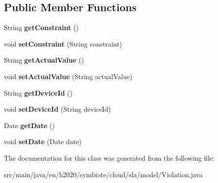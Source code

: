 \subsection*{Public Member Functions}
\begin{DoxyCompactItemize}
\item 
\mbox{\label{classeu_1_1h2020_1_1symbiote_1_1cloud_1_1sla_1_1model_1_1Violation_aee06224480e328f5052d47876c301592}} 
String {\bfseries get\+Constraint} ()
\item 
\mbox{\label{classeu_1_1h2020_1_1symbiote_1_1cloud_1_1sla_1_1model_1_1Violation_aa2c2d72d32f61bd8f852fffddb343901}} 
void {\bfseries set\+Constraint} (String constraint)
\item 
\mbox{\label{classeu_1_1h2020_1_1symbiote_1_1cloud_1_1sla_1_1model_1_1Violation_a3ba76e439797e49c5b3178a4bb631cc9}} 
String {\bfseries get\+Actual\+Value} ()
\item 
\mbox{\label{classeu_1_1h2020_1_1symbiote_1_1cloud_1_1sla_1_1model_1_1Violation_aea386e08b62af3fcdd207b2717125e8a}} 
void {\bfseries set\+Actual\+Value} (String actual\+Value)
\item 
\mbox{\label{classeu_1_1h2020_1_1symbiote_1_1cloud_1_1sla_1_1model_1_1Violation_aac1415e10148af4a37e2bcca5c1a56b6}} 
String {\bfseries get\+Device\+Id} ()
\item 
\mbox{\label{classeu_1_1h2020_1_1symbiote_1_1cloud_1_1sla_1_1model_1_1Violation_aa2f79b9b174a1de0410c41c86dcb2416}} 
void {\bfseries set\+Device\+Id} (String device\+Id)
\item 
\mbox{\label{classeu_1_1h2020_1_1symbiote_1_1cloud_1_1sla_1_1model_1_1Violation_af4347255a5e4f29e0eb4bd5597eeb094}} 
Date {\bfseries get\+Date} ()
\item 
\mbox{\label{classeu_1_1h2020_1_1symbiote_1_1cloud_1_1sla_1_1model_1_1Violation_af3885c00f5d823b3df6bf9f804d5d846}} 
void {\bfseries set\+Date} (Date date)
\end{DoxyCompactItemize}


The documentation for this class was generated from the following file\+:\begin{DoxyCompactItemize}
\item 
src/main/java/eu/h2020/symbiote/cloud/sla/model/Violation.\+java\end{DoxyCompactItemize}
